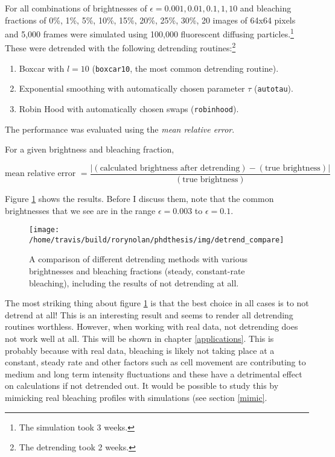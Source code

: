 \documentclass[12pt,]{book}
\providecommand{\tightlist}{%
  \setlength{\itemsep}{0pt}\setlength{\parskip}{0pt}}
\let\rmarkdownfootnote\footnote%
\def\footnote{\protect\rmarkdownfootnote}
\theoremstyle{definition}
\theoremstyle{definition}
\theoremstyle{definition}
\theoremstyle{remark}
\let\BeginKnitrBlock\begin \let\EndKnitrBlock\end
\begin{document}
For all combinations of brightnesses of
\(\epsilon = 0.001, 0.01, 0.1, 1, 10\) and bleaching fractions of 0\%,
1\%, 5\%, 10\%, 15\%, 20\%, 25\%, 30\%, 20 images of 64x64 pixels and
5,000 frames were simulated using 100,000 fluorescent diffusing
particles.\footnote{The simulation took 3 weeks.} These were detrended
with the following detrending routines:\footnote{The detrending took 2
  weeks.}

\begin{enumerate}
\def\labelenumi{\arabic{enumi}.}
\tightlist
\item
  Boxcar with \(l = 10\) (\texttt{boxcar10}, the most common detrending
  routine).
\item
  Exponential smoothing with automatically chosen parameter \(\tau\)
  (\texttt{autotau}).
\item
  Robin Hood with automatically chosen swaps (\texttt{robinhood}).
\end{enumerate}

The performance was evaluated using the \emph{mean relative error}.

\BeginKnitrBlock{definition}
\protect\hypertarget{def:unnamed-chunk-34}{}{\label{def:unnamed-chunk-34} }
For a given brightness and bleaching fraction,

\begin{equation}
\text{mean relative error } = \frac{|(\text{calculated brightness after detrending}) - (\text{true brightness})|}{(\text{true brightness})}
\label{eq:mean-relative-error}
\end{equation}
\EndKnitrBlock{definition}

Figure \ref{fig:detrend-compare} shows the results. Before I discuss
them, note that the common brightnesses that we see are in the range
\(\epsilon = 0.003\) to \(\epsilon = 0.1\).






\begin{figure}

\texttt{[image: /home/travis/build/rorynolan/phdthesis/img/detrend\_compare]} \hfill{}

\caption{A comparison of different detrending
methods with various brightnesses and bleaching fractions (steady,
constant-rate bleaching), including the results of not detrending at
all.}\label{fig:detrend-compare}
\end{figure}

The most striking thing about figure \ref{fig:detrend-compare} is that
the best choice in all cases is to not detrend at all! This is an
interesting result and seems to render all detrending routines
worthless. However, when working with real data, not detrending does not
work well at all. This will be shown in chapter \ref{applications}. This
is probably because with real data, bleaching is likely not taking place
at a constant, steady rate and other factors such as cell movement are
contributing to medium and long term intensity fluctuations and these
have a detrimental effect on calculations if not detrended out. It would
be possible to study this by mimicking real bleaching profiles with
simulations (see section \ref{mimic}.
\end{document}
